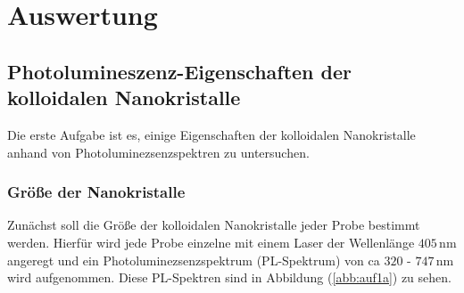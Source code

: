 \section{Auswertung}
\subsection{Photolumineszenz-Eigenschaften der kolloidalen Nanokristalle}
Die erste Aufgabe ist es, einige Eigenschaften der kolloidalen Nanokristalle anhand von Photoluminezsenzspektren zu untersuchen.
\subsubsection{ Gr\"{o}{\ss}e der Nanokristalle}
Zun\"{a}chst soll die Gr\"{o}{\ss}e der kolloidalen Nanokristalle jeder Probe bestimmt werden.
Hierf\"{u}r wird jede Probe einzelne mit einem Laser der Wellenl\"{a}nge $405 \,$nm angeregt und ein Photoluminezsenzspektrum (PL-Spektrum) von ca $320$ - $747 \,$nm wird aufgenommen.
Diese PL-Spektren sind in Abbildung (\ref{abb:auf1a}) zu sehen. 
